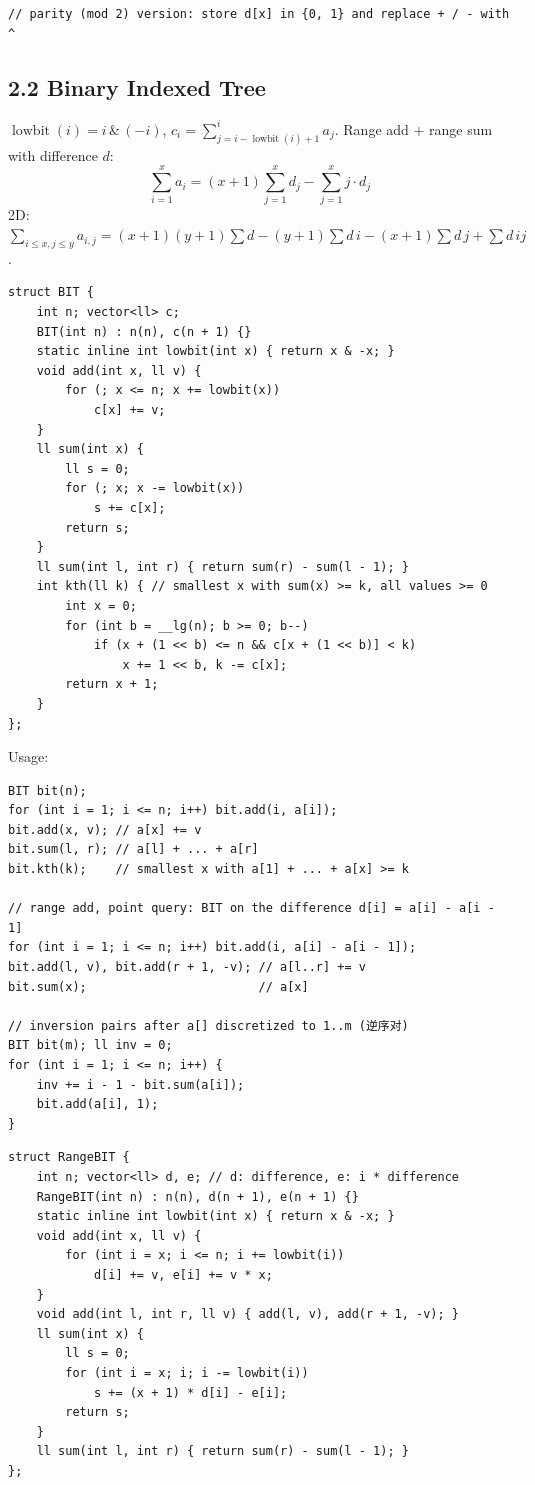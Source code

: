 \documentclass[8pt]{extarticle}
\begin{document}
\begin{multicols*}{3}
\begin{lstlisting}
// parity (mod 2) version: store d[x] in {0, 1} and replace + / - with ^
\end{lstlisting}

\subsection*{2.2 Binary Indexed Tree}

$\operatorname{lowbit}(i) = i \,\&\, (-i)$, $c_i = \sum_{j = i - \operatorname{lowbit}(i) + 1}^{i} a_j$. Range add + range sum with difference $d$:
\[\sum_{i=1}^{x} a_i = (x+1) \sum_{j=1}^{x} d_j - \sum_{j=1}^{x} j \cdot d_j\]
2D: $\sum_{i \le x, j \le y} a_{i,j} = (x+1)(y+1)\sum d - (y+1)\sum d \, i - (x+1)\sum d \, j + \sum d \, ij$.

\begin{lstlisting}
struct BIT {
    int n; vector<ll> c;
    BIT(int n) : n(n), c(n + 1) {}
    static inline int lowbit(int x) { return x & -x; }
    void add(int x, ll v) {
        for (; x <= n; x += lowbit(x))
            c[x] += v;
    }
    ll sum(int x) {
        ll s = 0;
        for (; x; x -= lowbit(x))
            s += c[x];
        return s;
    }
    ll sum(int l, int r) { return sum(r) - sum(l - 1); }
    int kth(ll k) { // smallest x with sum(x) >= k, all values >= 0
        int x = 0;
        for (int b = __lg(n); b >= 0; b--)
            if (x + (1 << b) <= n && c[x + (1 << b)] < k)
                x += 1 << b, k -= c[x];
        return x + 1;
    }
};
\end{lstlisting}

Usage:

\begin{lstlisting}
BIT bit(n);
for (int i = 1; i <= n; i++) bit.add(i, a[i]);
bit.add(x, v); // a[x] += v
bit.sum(l, r); // a[l] + ... + a[r]
bit.kth(k);    // smallest x with a[1] + ... + a[x] >= k

// range add, point query: BIT on the difference d[i] = a[i] - a[i - 1]
for (int i = 1; i <= n; i++) bit.add(i, a[i] - a[i - 1]);
bit.add(l, v), bit.add(r + 1, -v); // a[l..r] += v
bit.sum(x);                        // a[x]

// inversion pairs after a[] discretized to 1..m (逆序对)
BIT bit(m); ll inv = 0;
for (int i = 1; i <= n; i++) {
    inv += i - 1 - bit.sum(a[i]);
    bit.add(a[i], 1);
}
\end{lstlisting}

\begin{lstlisting}
struct RangeBIT {
    int n; vector<ll> d, e; // d: difference, e: i * difference
    RangeBIT(int n) : n(n), d(n + 1), e(n + 1) {}
    static inline int lowbit(int x) { return x & -x; }
    void add(int x, ll v) {
        for (int i = x; i <= n; i += lowbit(i))
            d[i] += v, e[i] += v * x;
    }
    void add(int l, int r, ll v) { add(l, v), add(r + 1, -v); }
    ll sum(int x) {
        ll s = 0;
        for (int i = x; i; i -= lowbit(i))
            s += (x + 1) * d[i] - e[i];
        return s;
    }
    ll sum(int l, int r) { return sum(r) - sum(l - 1); }
};
\end{lstlisting}


\end{multicols*}
\end{document}
